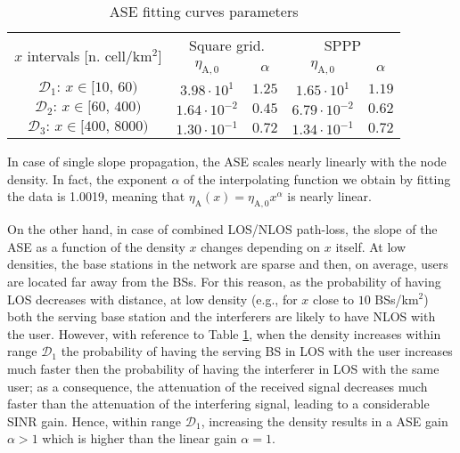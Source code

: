 \documentclass[twocoumn]{IEEEtran}
\begin{document}
\begin{table}[tbph]
\caption{ASE fitting curves parameters}
\label{table:ASEresults}
\centering

\begin{tabular}{|c|c|c|c|c|}
\hline 
\multirow{2}{*}{$x$ intervals [n. cell/km$^{2}$]} & \multicolumn{2}{c|}{Square grid.} & \multicolumn{2}{c|}{SPPP}\tabularnewline
\cline{2-5} 
 &  $\eta_{\mathrm{A},0}$ & $\alpha$  &$\eta_{\mathrm{A},0}$   & $\alpha$  \tabularnewline
\hline 
 $\mathcal{D}_{\mathrm{1}}:\,x\in[10,\,60)$ &  $3.98\cdot10^{1}$ &  $1.25$& $1.65\cdot10^{1}$ & $1.19$ \tabularnewline
\hline 
 $\mathcal{D}_{\mathrm{2}}:\,x\in[60,\,400)$ & $1.64\cdot10^{-2}$ &  $0.45$ & $6.79\cdot10^{-2}$  & $0.62$ \tabularnewline
\hline 
 $\mathcal{D}_{\mathrm{3}}:\,x\in[400,\,8000)$ & $1.30\cdot10^{-1}$ & $0.72$ & $1.34\cdot10^{-1}$ & $0.72$  \tabularnewline
\hline 
\end{tabular}

\end{table}

In case of single slope propagation, the ASE
scales nearly linearly with the node density. In fact, the exponent $\alpha$
of the interpolating function we obtain by fitting the data is 1.0019,
meaning that $\eta_{\mathrm{A}}(x)=\eta_{\mathrm{A},0}x^{\alpha}$ is nearly linear.

On the other hand, in case of combined LOS/NLOS path-loss, the slope of the ASE as a function of the density $x$ changes depending on $x$ itself.
At low densities, the base stations in the network are sparse and then, on average, users are located far away from the BSs. For this reason, as the probability of having LOS decreases with distance, at low density (e.g., for $x$ close to $10$ BSs/km$^2$) both the serving base station and the interferers are likely to have NLOS with the user. However, with reference to Table  \ref{table:ASEresults}, when the density increases within range $\mathcal{D}_{\mathrm{1}}$ the probability of having the serving BS in LOS with the user increases much faster then the probability of having the interferer in LOS with the same user; as a consequence, the attenuation of the received signal decreases much faster than the attenuation of the interfering signal, leading to a considerable SINR  gain. Hence, within range $\mathcal{D}_{\mathrm{1}}$, increasing the density results in a ASE gain $\alpha>1$ which is higher than the linear gain $\alpha=1$. 
\end{document}
